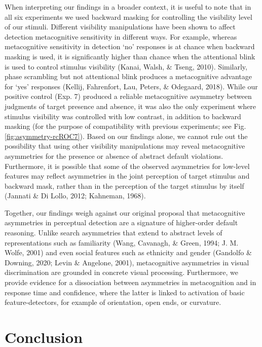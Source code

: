 \documentclass[12pt,twoside]{reedthesis}
\begin{document}
When interpreting our findings in a broader context, it is useful to note that in all six experiments we used backward masking for controlling the visibility level of our stimuli. Different visibility manipulations have been shown to affect detection metacognitive sensitivity in different ways. For example, whereas metacognitive sensitivity in detection `no' responses is at chance when backward masking is used, it is significantly higher than chance when the attentional blink is used to control stimulus visibility (Kanai, Walsh, \& Tseng, 2010). Similarly, phase scrambling but not attentional blink produces a metacognitive advantage for `yes' responses (Kellij, Fahrenfort, Lau, Peters, \& Odegaard, 2018). While our positive control (Exp. 7) produced a reliable metacognitive asymmetry between judgments of target presence and absence, it was also the only experiment where stimulus visibility was controlled with low contrast, in addition to backward masking (for the purpose of compatibility with previous experiments; see Fig. \ref{fig:asymmetry-rcROC7}). Based on our findings alone, we cannot rule out the possibility that using other visibility manipulations may reveal metacognitive asymmetries for the presence or absence of abstract default violations. Furthermore, it is possible that some of the observed asymmetries for low-level features may reflect asymmetries in the joint perception of target stimulus and backward mask, rather than in the perception of the target stimulus by itself (Jannati \& Di Lollo, 2012; Kahneman, 1968).

Together, our findings weigh against our original proposal that metacognitive asymmetries in perceptual detection are a signature of higher-order default reasoning. Unlike search asymmetries that extend to abstract levels of representations such as familiarity (Wang, Cavanagh, \& Green, 1994; J. M. Wolfe, 2001) and even social features such as ethnicity and gender (Gandolfo \& Downing, 2020; Levin \& Angelone, 2001), metacognitive asymmetries in visual discrimination are grounded in concrete visual processing. Furthermore, we provide evidence for a dissociation between asymmetries in metacognition and in response time and confidence, where the latter is linked to activation of basic feature-detectors, for example of orientation, open ends, or curvature.

\hypertarget{conclusion-1}{%
\section{Conclusion}\label{conclusion-1}}
\end{document}
